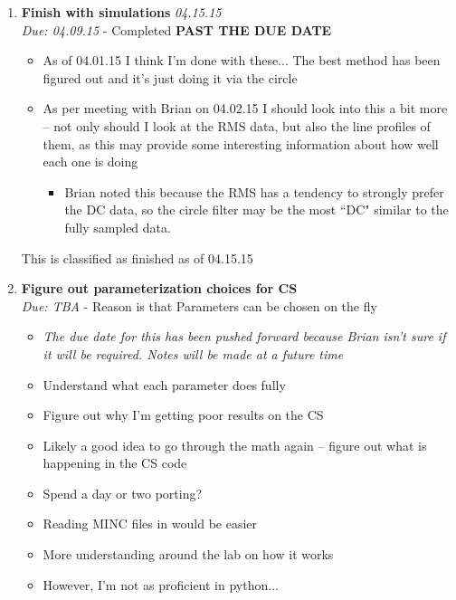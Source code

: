 \documentclass[11 pt]{article}
\newcommand{\bo}{\noindent\textbf}
\begin{document}

      
\begin{enumerate}
	\item \bo{Finish with simulations} \checkmark \emph{04.15.15}\\
	    \emph{Due: 04.09.15} - Completed \bo{PAST THE DUE DATE}\\
	    \begin{itemize}
      
		  \item As of 04.01.15 I think I'm done with these... The best method has been figured out and it's just doing it via the circle
		  \item As per meeting with Brian on 04.02.15 I should look into this a bit more -- not only should I look at the RMS data, but also the line profiles of them, as this may provide some interesting information about how well each one is doing
		  \begin{itemize}
			\item Brian noted this because the RMS has a tendency to strongly prefer the DC data, so the circle filter may be the most ``DC" similar to the fully sampled data.
		  \end{itemize}
	    
	    \end{itemize}
	    
	    This is classified as finished as of 04.15.15
	    
	\item \bo{Figure out parameterization choices for CS}\\
	    \emph{Due: TBA} - Reason is that Parameters can be chosen on the fly\\
	    \begin{itemize}
		  \item \emph{The due date for this has been pushed forward because Brian isn't sure if it will be required. Notes will be made at a future time}
		  \item Understand what each parameter does fully
		  \item Figure out why I'm getting poor results on the CS
		  \item Likely a good idea to go through the math again -- figure out what is happening in the CS code
		  \item Spend a day or two porting?
		  \item Reading MINC files in would be easier
		  \item More understanding around the lab on how it works 
		  \item However, I'm not as proficient in python...
	    \end{itemize}
      

\end{enumerate}
\end{document}
